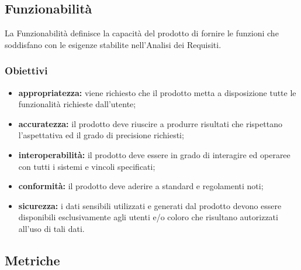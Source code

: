 \subsection{Funzionabilità}
	La Funzionabilità definisce la capacità del prodotto di fornire le funzioni che soddisfano con le esigenze stabilite nell'Analisi dei Requisiti.
	\subsubsection{Obiettivi}
		\begin{itemize}
			\item \textbf{appropriatezza:} viene richiesto che il prodotto metta a disposizione tutte le funzionalità richieste dall'utente;
			\item \textbf{accuratezza:} il prodotto deve riuscire a produrre risultati che rispettano l'aspettativa ed il grado di precisione richiesti;
			\item \textbf{interoperabilità:} il prodotto deve essere in grado di interagire ed operaree con tutti i sistemi e vincoli specificati;
			\item \textbf{conformità:} il prodotto deve aderire a standard e regolamenti noti;
			\item \textbf{sicurezza:} i dati sensibili utilizzati e generati dal prodotto devono essere disponibili esclusivamente agli utenti e/o coloro che risultano autorizzati all'uso di tali dati.
		\end{itemize}
	\subsection{Metriche}
	
